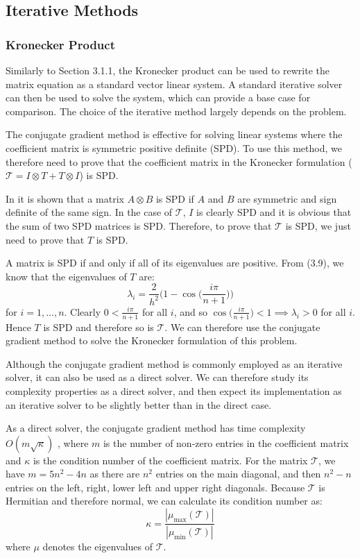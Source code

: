 \documentclass[11pt]{article}
\numberwithin{equation}{section}
\begin{document}
\newpage

\subsection{Iterative Methods}

\subsubsection{Kronecker Product}
Similarly to Section 3.1.1, the Kronecker product can be used to rewrite the matrix equation as a standard vector linear system. A standard iterative solver can then be used to solve the system, which can provide a base case for comparison. The choice of the iterative method largely depends on the problem.

The conjugate gradient method is effective for solving linear systems where the coefficient matrix is symmetric positive definite (SPD). To use this method, we therefore need to prove that the coefficient matrix in the Kronecker formulation ($\mathcal{T} = I \otimes T + T \otimes I$) is SPD.

In \cite{Brewer} it is shown that a matrix $A \otimes B$ is SPD if $A$ and $B$ are symmetric and sign definite of the same sign. In the case of $\mathcal{T}$, $I$ is clearly SPD and it is obvious that the sum of two SPD matrices is SPD. Therefore, to prove that $\mathcal{T}$ is SPD, we just need to prove that $T$ is SPD. 

A matrix is SPD if and only if all of its eigenvalues are positive. From (3.9), we know that the eigenvalues of $T$ are: 
\[ \lambda_i = \frac{2}{h^2} \Big( 1 - \cos \Big( \frac{i \pi}{n+1} \Big) \Big) \]
for $i=1, \dots, n$. Clearly $0 < \frac{i \pi}{n+1}$ for all $i$, and so $\cos \Big( \frac{i \pi}{n+1} \Big) < 1 \implies \lambda_i > 0$ for all $i$. Hence $T$ is SPD and therefore so is $\mathcal{T}$. We can therefore use the conjugate gradient method to solve the Kronecker formulation of this problem. 

Although the conjugate gradient method is commonly employed as an iterative solver, it can also be used as a direct solver. We can therefore study its complexity properties as a direct solver, and then expect its implementation as an iterative solver to be slightly better than in the direct case. 

As a direct solver, the conjugate gradient method has time complexity $O(m\sqrt{\kappa})$ \cite{Shewchuk}, where $m$ is the number of non-zero entries in the coefficient matrix and $\kappa$ is the condition number of the coefficient matrix. For the matrix $\mathcal{T}$, we have $m=5n^2 - 4n$ as there are $n^2$ entries on the main diagonal, and then $n^2 - n$ entries on the left, right, lower left and upper right diagonals. Because $\mathcal{T}$ is Hermitian and therefore normal, we can calculate its condition number as:
\begin{equation}
\kappa = \frac{|\mu_{\text{max}}(\mathcal{T})|}{|\mu_{\text{min}}(\mathcal{T})|}
\end{equation}
where $\mu$ denotes the eigenvalues of $\mathcal{T}$. 
\end{document}
